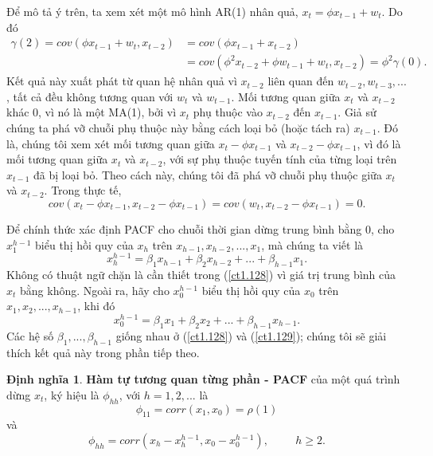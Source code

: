 \documentclass[12pt, a4paper,oneside]{book}
\theoremstyle{definition}
\newtheorem{dn}[theo]{Định nghĩa}
\begin{document}
Để mô tả ý trên, ta xem xét một mô hình AR(1) nhân quả, $x_t=\phi x_{t-1}+w_t$. Do đó
\begin{align*}
 \gamma(2) = cov(\phi x_{t-1} + w_{t}, x_{t-2}) & = cov(\phi x_{t-1}+x_{t-2})\\
 & = cov(\phi^{2}x_{t-2}+\phi w_{t-1}+w_{t},x_{t-2})= \phi^{2}\gamma(0).
\end{align*}
Kết quả này xuất phát từ quan hệ nhân quả vì $x_{t-2}$ liên quan đến ${w_{t-2},w_{t-3},... }$, tất cả đều không tương quan với $w_{t}$ và $w_{t-1}$. Mối tương quan giữa $x_{t}$ và $x_{t-2}$ khác $0$, vì nó là một MA(1), bởi vì $x_{t}$ phụ thuộc vào $x_{t-2}$ đến $x_{t-1}$. Giả sử chúng ta phá vỡ chuỗi phụ thuộc này bằng cách loại bỏ (hoặc tách ra) $x_{t-1}$. Đó là, chúng tôi xem xét mối tương quan giữa $x_{t}-\phi x_{t-1}$ và $x_{t-2}-\phi x_{t-1}$, vì đó là mối tương quan giữa $x_{t}$ và $x_{t-2}$, với sự phụ thuộc tuyến tính của từng loại trên $x_{t-1}$ đã bị loại bỏ. Theo cách này, chúng tôi đã phá vỡ chuỗi phụ thuộc giữa $x_{t}$ và $x_{t-2}$. Trong thực tế, 
$$cov(x_{t}-\phi x_{t-1},x_{t-2}-\phi x_{t-1}) = cov(w_{t},x_{t-2}-\phi x_{t-1}) = 0.$$

Để chính thức xác định PACF cho chuỗi thời gian dừng trung bình bằng $0$, cho $x_1^{h-1}$ biểu thị hồi quy của $x_{h}$ trên ${x_{h-1}, x_{h-2},...,x_{1}}$, mà chúng ta viết là 
\begin{equation}
x_h^{h-1}= \beta_{1}x_{h-1}+\beta_{2}x_{h-2}+...+\beta_{h-1}x_{1}. \label{ct1.128}
\end{equation}
Không có thuật ngữ chặn là cần thiết trong (\ref{ct1.128}) vì giá trị trung bình của $x_{t}$ bằng không. Ngoài ra, hãy cho $x_0^{h-1}$ biểu thị hồi quy của $x_{0}$ trên ${x_{1},x_{2},...,x_{h-1}}$, khi đó 
\begin{equation}
x_0^{h-1} = \beta_{1}x_{1}+\beta_{2}x_{2}+...+\beta_{h-1}x_{h-1}. \label{ct1.129}
\end{equation}
Các hệ số $\beta_{1},...,\beta_{h-1}$ giống nhau ở (\ref{ct1.128}) và (\ref{ct1.129}); chúng tôi sẽ giải thích kết quả này trong phần tiếp theo.

\begin{dn}\textbf{Hàm tự tương quan từng phần - PACF} của một quá trình dừng $x_{t}$, ký hiệu là $\phi_{hh}$, với $h=1,2,...$ là
\begin{equation}
\phi_{11}=corr(x_{1},x_{0})=\rho(1) \label{ct1.130}
\end{equation}	
và 
\begin{equation}
\phi_{hh} = corr(x_{h}-x_h^{h-1}, x_{0}-x_0^{h-1}), \hspace{1cm} h \geq 2. \label{ct1.131}	
\end{equation}
\end{dn}
\end{document}

